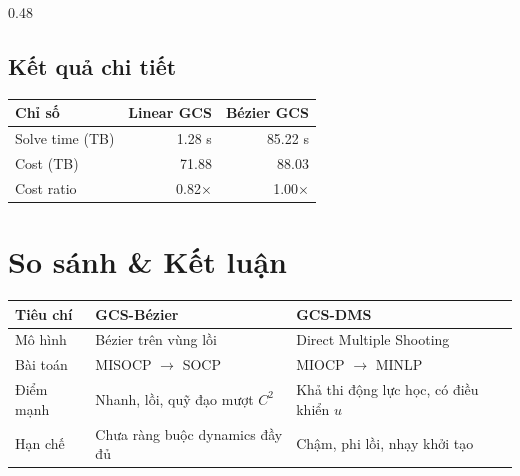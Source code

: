 \documentclass[final]{beamer}
\begin{document}
\begin{frame}[t]
\begin{columns}[t,totalwidth=\textwidth]
\begin{column}{0.48\textwidth}
\begin{center}
      \subsection{Kết quả chi tiết}
      \end{center}
      \begin{center}
        \small\renewcommand{\arraystretch}{1.2}
        \begin{tabular}{lrr}
          \toprule
          \textbf{Chỉ số} & \textbf{Linear GCS} & \textbf{Bézier GCS} \\
          \midrule
          Solve time (TB) & 1.28 s              & 85.22 s             \\
          Cost (TB)       & 71.88               & 88.03               \\
          Cost ratio      & 0.82$\times$        & 1.00$\times$        \\
          \bottomrule
        \end{tabular}
      \end{center}
      
      \vspace{0.6em}
      \section{So sánh \& Kết luận}

      \begin{center}
        \small\renewcommand{\arraystretch}{1.25}
        \begin{tabular}{@{}p{5cm}p{10cm}p{10cm}@{}}
          \toprule
          \textbf{Tiêu chí} & \textbf{GCS-Bézier}                     & \textbf{GCS-DMS}             \\
          \midrule
          Mô hình
                            & Bézier trên vùng lồi
                            & Direct Multiple Shooting                                               \\[2pt]

          Bài toán          & MISOCP $\rightarrow$ SOCP               & MIOCP $\rightarrow$ MINLP    \\[2pt]

          Điểm mạnh
                            & Nhanh, lồi, quỹ đạo mượt $C^2$
                            & Khả thi động lực học, có điều khiển $u$                                \\[2pt]

          Hạn chế           & Chưa ràng buộc dynamics đầy đủ          & Chậm, phi lồi, nhạy khởi tạo \\[2pt]


\end{tabular}
\end{center}
\end{column}
\end{columns}
\end{frame}
\end{document}
